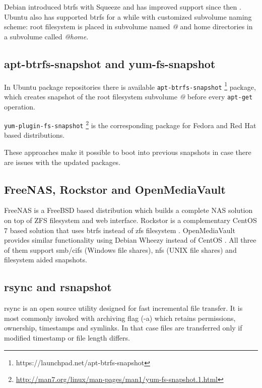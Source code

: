 \documentclass[a4paper,11pt]{kth-mag}
\begin{document}
Debian introduced \acrshort{btrfs} with Squeeze and has improved support
since then \cite{debian-btrfs}.
Ubuntu also has supported \acrshort{btrfs} for a while with customized
subvolume naming scheme:
root filesystem is placed in subvolume named \emph{@}
and home directories in a subvolume called \emph{@home}.

\subsection{apt-btrfs-snapshot and yum-fs-snapshot}

In Ubuntu package repositories there is available
\lstinline!apt-btrfs-snapshot!
\footnote{https://launchpad.net/apt-btrfs-snapshot}
package,
which creates snapshot of the root filesystem subvolume \emph{@}
before every \lstinline!apt-get! operation.

\lstinline!yum-plugin-fs-snapshot!
\footnote{\url{http://man7.org/linux/man-pages/man1/yum-fs-snapshot.1.html}}
is the corresponding package for Fedora and
Red Hat based distributions.


These approaches make it possible to boot into previous snapshots
in case there are issues with the updated packages.

\subsection{FreeNAS, Rockstor and OpenMediaVault}

FreeNAS is a FreeBSD \cite{freenas}
based distribution which builds a complete NAS solution on top of
ZFS filesystem and web interface.
Rockstor is a complementary CentOS 7 based solution that uses \acrshort{btrfs} instead
of \acrshort{zfs} filesystem \cite{rockstor}.
OpenMediaVault provides similar functionality using Debian Wheezy
instead of CentOS \cite{openmediavault}.
All three of them support \acrshort{smb}/\acrshort{cifs} (Windows file shares),
\acrshort{nfs} (UNIX file shares) and filesystem aided snapshots.


\subsection{rsync and rsnapshot}

rsync is an open source utility designed for
fast incremental file transfer.
It is most commonly invoked with archiving flag (-a) which
retains permissions, ownership, timestamps and symlinks.
In that case files are transferred only if
modified timestamp or file length differs.
\end{document}
